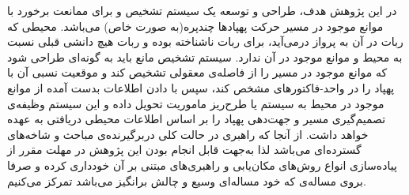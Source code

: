 در این پژوهش هدف، طراحی و توسعه یک سیستم تشخیص و  برای ممانعت برخورد با موانع موجود در مسیر حرکت پهپادها چندپره(به صورت خاص) می‌باشد. محیطی که ربات در آن به پرواز درمی‌آید، برای ربات ناشناخته بوده و ربات هیچ دانشی قبلی نسبت به محیط و موانع موجود در آن ندارد. سیستم تشخیص مانع باید به گونه‌ای طراحی شود که موانع موجود در مسیر را از فاصله‌ی معقولی تشخیص کند و موقعیت نسبی آن با پهپاد را در واحد-فاکتورهای مشخص کند، سپس با دادن اطلاعات بدست آمده از موانع موجود در محیط به سیستم  یا طرح‌ریز ماموریت تحویل داده و این سیستم وظیفه‌‌ی تصمیم‌گیری مسیر و جهت‌دهی پهپاد را بر اساس اطلاعات محیطی دریافتی به عهده خواهد داشت.
از آنجا که راهبری در حالت کلی دربرگیرنده‌ی مباحث و شاخه‌های گسترده‌ای می‌باشد لذا به‌جهت قابل انجام بودن این پژوهش در مهلت مقرر از پیاده‌سازی انواع روش‌های مکان‌یابی و راهبری‌های مبتنی بر آن خودداری کرده و صرفا بروی مساله‌ی  که خود مساله‌ای وسیع و چالش برانگیز می‌باشد تمرکز می‌کنیم.
